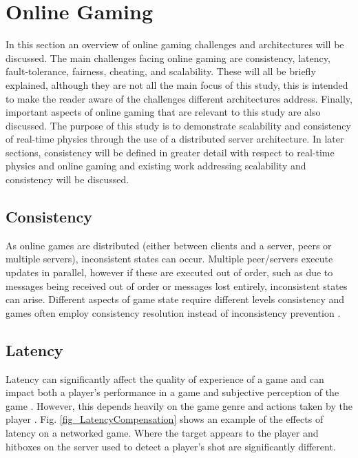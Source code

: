 \section{Online Gaming}\label{OnlineGaming}
In this section an overview of online gaming challenges and architectures will be discussed. 
The main challenges facing online gaming are consistency, latency, fault-tolerance, fairness, cheating, and scalability. 
These will all be briefly explained, although they are not all the main focus of this study, this is intended to make the reader aware of the challenges different architectures address. Finally, important aspects of online gaming that are relevant to this study are also discussed. The purpose of this study is to demonstrate scalability and consistency of real-time physics through the use of a distributed server architecture. In later sections, consistency will be defined in greater detail with respect to real-time physics and online gaming and existing work addressing scalability and consistency will be discussed. 

\subsection{Consistency}
As online games are distributed (either between clients and a server, peers or multiple servers), inconsistent states can occur. Multiple peer/servers execute updates in parallel, however if these are executed out of order, such as due to messages being received out of order or messages lost entirely, inconsistent states can arise.  Different aspects of game state require different levels consistency and games often employ consistency resolution instead of inconsistency prevention \cite{P2PForMMOs}.


\subsection{Latency}
Latency can significantly affect the quality of experience of a game and can impact both a player's performance in a game \cite{EffectsofLossandLatency, claypool2010latency} and subjective perception of the game \cite{dick2005analysis}. However, this depends heavily on the game genre and actions taken by the player \cite{LatencyandPlayerActions, claypool2010latency}. Fig. \ref{fig_LatencyCompensation} shows an example of the effects of latency on a networked game. Where the target appears to the player and hitboxes on the server used to detect a player's shot are significantly different.

